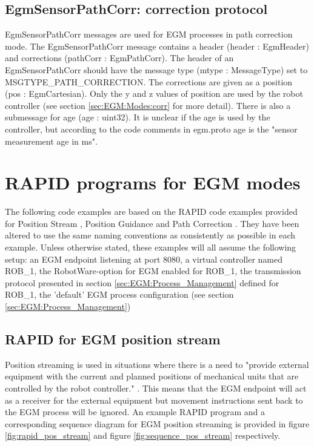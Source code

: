 \documentclass{cslthse-msc}
\begin{document}
\subsection{EgmSensorPathCorr: correction protocol}
\label{sec:EGM:Message_Protos:EgmSensorPathCorr}
EgmSensorPathCorr messages are used for EGM processes in path correction mode. The EgmSensorPathCorr message contains a header (header : EgmHeader) and corrections (pathCorr : EgmPathCorr). The header of an EgmSensorPathCorr should have the message type (mtype : MessageType) set to {\scriptsize{MSGTYPE\_PATH\_CORRECTION}}. The corrections are given as a position (pos : EgmCartesian). Only the y and z values of position are used by the robot controller (see section \ref{sec:EGM:Modes:corr} for more detail). There is also a submessage for age (age : uint32). It is unclear if the age is used by the controller, but according to the code comments in egm.proto age is the "sensor measurement age in ms". \par


\section{RAPID programs for EGM modes}
\label{sec:EGM:Rapid_Programs}
The following code examples are based on the RAPID code examples provided for Position Stream \cite[Sec. 9.3.6.1]{ABB:controller_software}, Position Guidance \cite[Sec. 9.3.6.2]{ABB:controller_software} and Path Correction  \cite[Sec. 9.3.6.3]{ABB:controller_software}. They have been altered to use the same naming conventions as consistently as possible in each example. Unless otherwise stated, these examples will all assume the following setup: an EGM endpoint listening at port 8080, a virtual controller named ROB\_1, the RobotWare-option for EGM enabled for ROB\_1, the transmission protocol presented in section \ref{sec:EGM:Process_Management} defined for ROB\_1, the 'default' EGM process configuration (see section \ref{sec:EGM:Process_Management})




\subsection{RAPID for EGM position stream}
\label{sec:EGM:Rapid_Programs:stream}
Position streaming is used in situations where there is a need to "provide external equipment with the current and planned positions of mechanical units that are controlled by the robot controller." \cite[Sec. 9.3.1.1]{ABB:controller_software}. This means that the EGM endpoint will act as a receiver for the external equipment but movement instructions sent back to the EGM process will be ignored. An example RAPID program and a corresponding sequence diagram for EGM position streaming is provided in figure \ref{fig:rapid_pos_stream} and figure \ref{fig:sequence_pos_stream} respectively. \par
\end{document}
